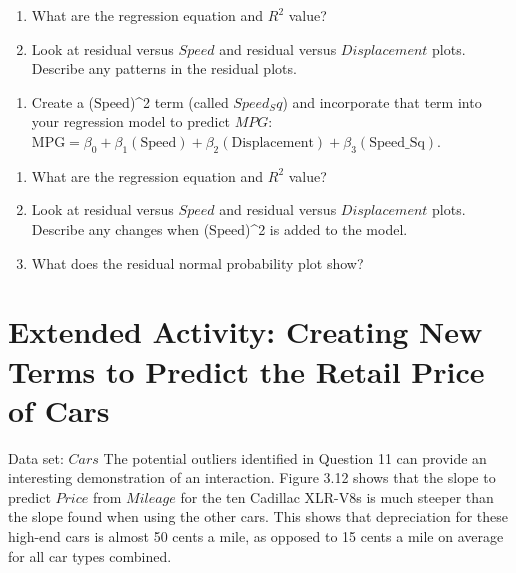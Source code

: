\documentclass[
]{report}
\providecommand{\tightlist}{%
  \setlength{\itemsep}{0pt}\setlength{\parskip}{0pt}}
\begin{document}
\begin{enumerate}
\def\labelenumi{\alph{enumi}.}
\tightlist
\item
  What are the regression equation and \(R^2\) value?
\item
  Look at residual versus \(Speed\) and residual versus \(Displacement\) plots. Describe any patterns in the residual plots.
\end{enumerate}

\begin{enumerate}
\def\labelenumi{\arabic{enumi}.}
\setcounter{enumi}{39}
\tightlist
\item
  Create a (\(\mathrm{Speed}\))\^{}2 term (called \(Speed_Sq\)) and incorporate that term into your regression model to predict \(MPG\): \(\mathrm{MPG} = \beta_0 + \beta_1(\mathrm{Speed}) + \beta_2(\mathrm{Displacement}) + \beta_3(\mathrm{Speed\_Sq}).\)
\end{enumerate}

\begin{enumerate}
\def\labelenumi{\alph{enumi}.}
\tightlist
\item
  What are the regression equation and \(R^2\) value?
\item
  Look at residual versus \(Speed\) and residual versus \(Displacement\) plots. Describe any changes when (\(\mathrm{Speed}\))\^{}2 is added to the model.
\item
  What does the residual normal probability plot show?
\end{enumerate}

\hypertarget{extended-activity-creating-new-terms-to-predict-the-retail-price-of-cars}{%
\section*{Extended Activity: Creating New Terms to Predict the Retail Price of Cars}\label{extended-activity-creating-new-terms-to-predict-the-retail-price-of-cars}}

Data set: \(Cars\)
The potential outliers identified in Question 11 can provide an interesting demonstration of an interaction. Figure 3.12 shows that the slope to predict \(Price\) from \(Mileage\) for the ten Cadillac XLR-V8s is much steeper than the slope found when using the other cars. This shows that depreciation for these high-end cars is almost 50 cents a mile, as opposed to 15 cents a mile on average for all car types combined.
\end{document}
